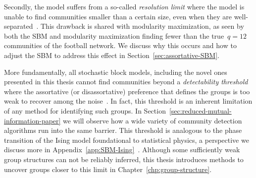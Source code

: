 Secondly, the model suffers from a so-called \emph{resolution limit} where the model is unable to find communities smaller than a certain size, even when they are well-separated~\cite{FB07}. This drawback is shared with modularity maximization, as seen by both the SBM and modularity maximization finding fewer than the true~$q = 12$ communities of the football network. We discuss why this occurs and how to adjust the SBM to address this effect in Section~\ref{sec:assortative-SBM}.

More fundamentally, all stochastic block models, including the novel ones presented in this thesis cannot find communities beyond a \emph{detectability threshold} where the assortative (or disassortative) preference that defines the groups is too weak to recover among the noise~\cite{Abbe18}. In fact, this threshold is an inherent limitation of any method for identifying such groups. In Section~\ref{sec:reduced-mutual-information-paper} we will observe how a wide variety of community detection algorithms run into the same barrier. This threshold is analogous to the phase transition of the Ising model foundational to statistical physics, a perspective we discuss more in Appendix~\ref{app:SBM-Ising}~\cite{Moore17}. Although some sufficiently weak group structures can not be reliably inferred, this thesis introduces methods to uncover groups closer to this limit in Chapter~\ref{chp:group-structure}.